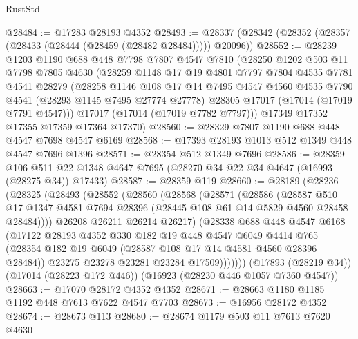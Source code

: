 \begin{lexlean}{RustStd}
\begin{coremodule}
@28484 := @17283 @28193 @4352
@28493 := @28337 (@28342 (@28352 (@28357 (@28433 (@28444 (@28459 (@28482 @28484))))) @20096))
@28552 := @28239
    @1203
    @1190
    @688
    @448
    @7798
    @7807
    @4547
    @7810
    (@28250
      @1202
      @503
      @11
      @7798
      @7805
      @4630
      (@28259
        @1148
        @17
        @19
        @4801
        @7797
        @7804
        @4535
        @7781
        @4541
        @28279
        (@28258
          @1146
          @108
          @17
          @14
          @7495
          @4547
          @4560
          @4535
          @7790
          @4541
          (@28293 @1145 @7495 @27774 @27778)
          @28305
          @17017
          (@17014 (@17019 @7791 @4547)))
        @17017
        (@17014 (@17019 @7782 @7797)))
      @17349
      @17352
      @17355
      @17359
      @17364
      @17370)
@28560 := @28329 @7807 @1190 @688 @448 @4547 @7698 @4547 @6169
@28568 := @17393 @28193 @1013 @512 @1349 @448 @4547 @7696 @1396
@28571 := @28354 @512 @1349 @7696
@28586 := @28359
    @106
    @511
    @22
    @1348
    @4647
    @7695
    (@28270 @34 @22 @34 @4647 (@16993 (@28275 @34)) @17433)
@28587 := @28359 @119
@28660 := @28189
    (@28236
      (@28325
        (@28493
          (@28552
            (@28560
              (@28568
                (@28571
                  (@28586
                    (@28587
                      @510
                      @17
                      @1347
                      @4581
                      @7694
                      @28396
                      (@28445 @108 @61 @14 @5829 @4560 @28458 @28484))))
                @26208
                @26211
                @26214
                @26217)
              (@28338
                @688
                @448
                @4547
                @6168
                (@17122
                  @28193
                  @4352
                  @330
                  @182
                  @19
                  @448
                  @4547
                  @6049
                  @4414
                  @765
                  (@28354 @182 @19 @6049 (@28587 @108 @17 @14 @4581 @4560 @28396 @28484))
                  @23275
                  @23278
                  @23281
                  @23284
                  @17509)))))))
    (@17893 (@28219 @34))
    (@17014 (@28223 @172 @446))
    (@16923 (@28230 @446 @1057 @7360 @4547))
@28663 := @17070 @28172 @4352 @4352
@28671 := @28663 @1180 @1185 @1192 @448 @7613 @7622 @4547 @7703
@28673 := @16956 @28172 @4352
@28674 := @28673 @113
@28680 := @28674 @1179 @503 @11 @7613 @7620 @4630

\end{coremodule}
\end{lexlean}
